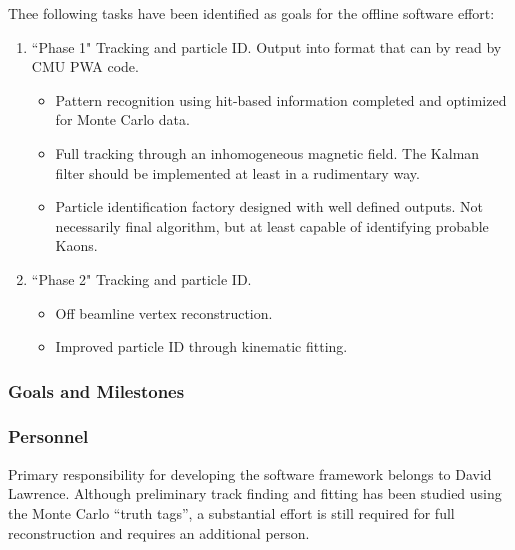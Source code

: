 \documentclass[10pt]{article}
\begin{document}
Thee following tasks have been identified as goals for the offline
software effort:

\begin{enumerate}
\item ``Phase 1" Tracking and particle ID. Output into format that can
by read by CMU PWA code.
   \begin{itemize}
    \item Pattern recognition using hit-based information completed and optimized for Monte Carlo data.
    \item Full tracking through an inhomogeneous magnetic field. The Kalman
   filter should be implemented at least in a rudimentary way.
    \item Particle identification factory designed with well defined outputs.
   Not necessarily final algorithm, but at least capable of identifying probable Kaons.
   \end{itemize}                                                                                            
\item ``Phase 2" Tracking and particle ID.
  \begin{itemize}
   \item Off beamline vertex reconstruction.
   \item Improved particle ID through kinematic fitting.
   \end{itemize}
\end{enumerate}


\subsubsection*{Goals and Milestones}


\subsubsection*{Personnel}

Primary responsibility for developing the software framework belongs to David Lawrence.
Although preliminary track finding and fitting has been studied using the
Monte Carlo ``truth tags'', a substantial effort is still required for full reconstruction
and requires an additional person.
\end{document}
